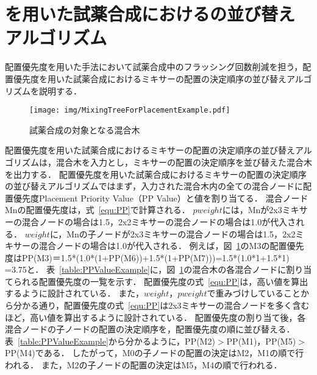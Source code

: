 \section{を用いた試薬合成におけるの並び替えアルゴリズム}
配置優先度を用いた手法において試薬合成中のフラッシング回数削減を担う，配置優先度を用いた試薬合成におけるミキサーの配置の決定順序の並び替えアルゴリズムを説明する．


\begin{figure}[tbp]
    \centering\texttt{[image: img/MixingTreeForPlacementExample.pdf]}
 \caption{試薬合成の対象となる混合木}\label{fig:placementTree}
\end{figure}

配置優先度を用いた試薬合成におけるミキサーの配置の決定順序の並び替えアルゴリズムは，混合木を入力とし，ミキサーの配置の決定順序を並び替えた混合木を出力する．
配置優先度を用いた試薬合成におけるミキサーの配置の決定順序の並び替えアルゴリズムではまず，入力された混合木内の全ての混合ノードに配置優先度Placement Priority Value（PP Value）と値を割り当てる．
混合ノードMnの配置優先度は，式~\eqref{equ:PP}で計算される．
$pweight$には，Mnが2x3ミキサーの混合ノードの場合は1.5，2x2ミキサーの混合ノードの場合は1.0が代入される．
$weight$に，Mnの子ノードが2x3ミキサーの混合ノードの場合は1.5，2x2ミキサーの混合ノードの場合は1.0が代入される．
例えば，図~\ref{fig:placementTree}のM3の配置優先度はPP(M3)＝1.5*(1.0*(1+PP(M6))+1.5*(1+PP(M7)))=1.5*(1.0*1+1.5*1) =3.75と．
表~\ref{table:PPValueExample}に，図~\ref{fig:placementTree}の混合木の各混合ノードに割り当てられる配置優先度の一覧を示す．
配置優先度の式~\eqref{equ:PP}は，高い値を算出するように設計されている．
また，$weight，pweight$で重みづけしていることから分かる通り，配置優先度の式~\eqref{equ:PP}は2x3ミキサーの混合ノードを多く含むほど，高い値を算出するように設計されている．
配置優先度の割り当て後，各混合ノードの子ノードの配置の決定順序を，配置優先度の順に並び替える．
表~\ref{table:PPValueExample}から分かるように，PP(M2)$>$PP(M1)，PP(M5)$>$PP(M4)である．
したがって，M0の子ノードの配置の決定はM2，M1の順で行われる．
また，M2の子ノードの配置の決定はM5，M4の順で行われる．


